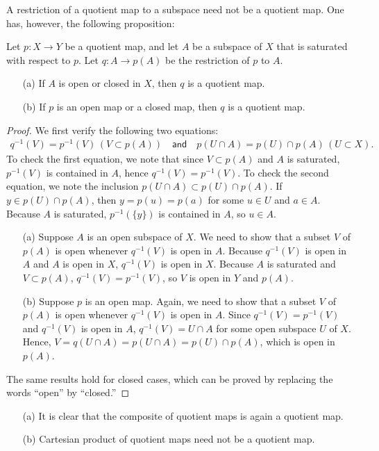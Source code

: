 A restriction of a quotient map to a subspace need not be a quotient map.
One has, however, the following proposition:
\begin{prop}
    Let $p: X\rightarrow Y$ be a quotient map, and let $A$ be a subspace of $X$ that is saturated with respect to $p$.
    Let $q: A\rightarrow p(A)$ be the restriction of $p$ to $A$.
    \begin{enumerate}
        \item[(a)]
        {
            If $A$ is open or closed in $X$, then $q$ is a quotient map.
        }
        \item[(b)]
        {
            If $p$ is an open map or a closed map, then $q$ is a quotient map.
        }
    \end{enumerate}
\end{prop}
\begin{proof}
    We first verify the following two equations:
    \begin{align*}
        q^{-1}(V)=p^{-1}(V)\,(V\subset p(A))\quad\textsf{and}\quad
        p(U\cap A)=p(U)\cap p(A)\,(U\subset X).
    \end{align*}
    To check the first equation, we note that since $V\subset p(A)$ and $A$ is saturated, $p^{-1}(V)$ is contained in $A$, hence $q^{-1}(V)=p^{-1}(V)$.
    To check the second equation, we note the inclusion $p(U\cap A)\subset p(U)\cap p(A)$.
    If $y\in p(U)\cap p(A)$, then $y=p(u)=p(a)$ for some $u\in U$ and $a\in A$.
    Because $A$ is saturated, $p^{-1}(\{y\})$ is contained in $A$, so $u\in A$.
    \begin{enumerate}
        \item[(a)]
        {
            Suppose $A$ is an open subspace of $X$.
            We need to show that a subset $V$ of $p(A)$ is open whenever $q^{-1}(V)$ is open in $A$.
            Because $q^{-1}(V)$ is open in $A$ and $A$ is open in $X$, $q^{-1}(V)$ is open in $X$.
            Because $A$ is saturated and $V\subset p(A)$, $q^{-1}(V)=p^{-1}(V)$, so $V$ is open in $Y$ and $p(A)$.
        }
        \item[(b)]
        {
            Suppose $p$ is an open map.
            Again, we need to show that a subset $V$ of $p(A)$ is open whenever $q^{-1}(V)$ is open in $A$.
            Since $q^{-1}(V)=p^{-1}(V)$ and $q^{-1}(V)$ is open in $A$, $q^{-1}(V)=U\cap A$ for some open subspace $U$ of $X$.
            Hence, $V=q(U\cap A)=p(U\cap A)=p(U)\cap p(A)$, which is open in $p(A)$.
        }
    \end{enumerate}
    The same results hold for closed cases, which can be proved by replacing the words ``open'' by ``closed.''
\end{proof}
\begin{rmk}
    \begin{enumerate}
        \item[(a)]
        {
            It is clear that the composite of quotient maps is again a quotient map.
        }
        \item[(b)]
        {
            Cartesian product of quotient maps need not be a quotient map.
        }
    \end{enumerate}
\end{rmk}

